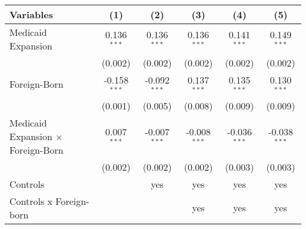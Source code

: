 \small

\renewcommand*{\arraystretch}{0.5}

\begin{threeparttable}[b]
    \begin{tabular}{lccccc}
        \tabularnewline \midrule  \midrule


        Variables      & (1)       & (2)       & (3)       & (4)       & (5) \\ 
        \midrule 
        Medicaid Expansion         & 0.136$^{***}$  & 0.136$^{***}$  & 0.136$^{***}$ & 0.141$^{***}$  & 0.149$^{***}$ \\   
                                   & (0.002)        & (0.002)        & (0.002)       & (0.002)        & (0.002) \\  
                                                         
        Foreign-Born               & -0.158$^{***}$ & -0.092$^{***}$ & 0.137$^{***}$ & 0.135$^{***}$  & 0.130$^{***}$ \\   
                                   & (0.001)        & (0.005)        & (0.008)       & (0.009)        & (0.009) \\   
        Medicaid Expansion $\times$ Foreign-Born      
                                   & 0.007$^{***}$  & -0.007$^{***}$ & -0.008$^{***}$ & -0.036$^{***}$ & -0.038$^{***}$ \\   
                                   & (0.002)        & (0.002)        & (0.002)       & (0.003)        & (0.003) \\   
        \midrule 
        Controls                  &                & yes            & yes           & yes            & yes \\  
        Controls x Foreign-born   &                &                & yes           & yes            & yes \\  
         

\end{tabular}
\end{threeparttable}
